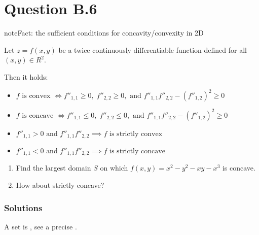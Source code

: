 \documentclass[letterpaper,10pt,english]{jupyterBook}
\begin{document}
\section{Question B.6}
\label{\detokenize{03.exercises.B:question-b-6}}
\begin{sphinxadmonition}{note}{Fact: the sufficient conditions for concavity/convexity in 2D}

\sphinxAtStartPar
Let \(z = f(x,y)\) be a twice continuously differentiable function defined for all
\((x, y) \in R^2\).

\sphinxAtStartPar
Then it holds:
\begin{itemize}
\item {} 
\sphinxAtStartPar
\(f \text{ is convex } \iff f''_{1,1} \ge 0, \; f''_{2,2} \ge 0 , \text{ and } f''_{1,1} f''_{2,2} − (f''_{1,2})^2 \ge 0\)

\item {} 
\sphinxAtStartPar
\(f \text{ is concave } \iff f''_{1,1} \le 0, \; f''_{2,2} \le 0 , \text{ and } f''_{1,1} f''_{2,2} − (f''_{1,2})^2 \ge 0\)

\item {} 
\sphinxAtStartPar
\(f''_{1,1} > 0 \text{ and } f''_{1,1} f''_{2,2} \implies f \text{ is strictly convex}\)

\item {} 
\sphinxAtStartPar
\(f''_{1,1} < 0 \text{ and } f''_{1,1} f''_{2,2} \implies f \text{ is strictly concave}\)

\end{itemize}
\end{sphinxadmonition}
\begin{enumerate}
%
\item {} 
\sphinxAtStartPar
Find the largest domain \(S\) on which
\(f(x, y) = x^2 − y^2 − xy − x^3\) is concave.

\item {} 
\sphinxAtStartPar
How about strictly concave?

\end{enumerate}
\subsubsection*{Solutions}

\sphinxAtStartPar
{}

\sphinxAtStartPar
A set is , see a precise {\hyperref[\detokenize{03.set_theory:ref-set-defition}]{}}.
\end{document}
